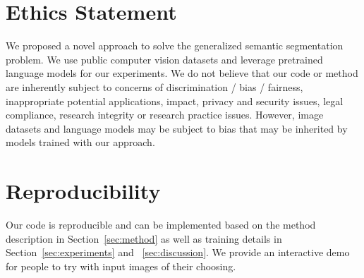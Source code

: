 \section*{Ethics Statement}
We proposed a novel approach to solve the generalized semantic segmentation problem. We use public computer vision datasets and leverage pretrained language models for our experiments. We do not believe that our code or method are inherently subject to concerns of discrimination / bias / fairness, inappropriate potential applications, impact, privacy and security issues, legal compliance, research integrity or research practice issues. However, image datasets and language models may be subject to bias that may be inherited by models trained with our approach.


\section*{Reproducibility}
Our code is reproducible and can be implemented based on the method description in Section~\ref{sec:method} as well as training details in Section~\ref{sec:experiments} and ~\ref{sec:discussion}. We provide an interactive demo for people to try with input images of their choosing.

